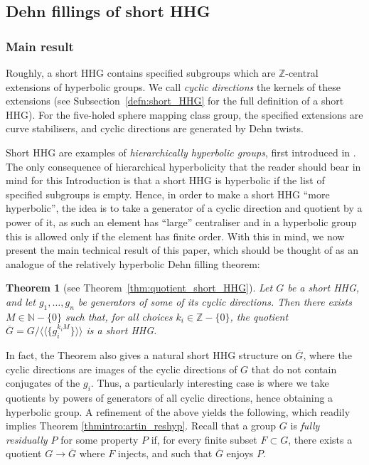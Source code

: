 \documentclass[svgnames]{amsart}
\theoremstyle{plain}
\newtheorem{thmintro}{Theorem}
\theoremstyle{definition}
\newcommand{\Z}{\mathbb{Z}}
\newcommand{\ov}[1]{\overline{#1}}
\begin{document}
\subsection*{Dehn fillings of short HHG}
\subsubsection*{Main result}
Roughly, a short HHG contains specified subgroups which are $\mathbb Z$-central extensions of hyperbolic groups. We call \emph{cyclic directions} the kernels of these extensions (see Subsection~\ref{defn:short_HHG} for the full definition of a short HHG). For the five-holed sphere mapping class group, the specified extensions are curve stabilisers, and cyclic directions are generated by Dehn twists. 

Short HHG are examples of \emph{hierarchically hyperbolic groups}, first introduced in \cite{HHS_I}. The only consequence of hierarchical hyperbolicity that the reader should bear in mind for this Introduction is that a short HHG is hyperbolic if the list of specified subgroups is empty. Hence, in order to make a short HHG “more hyperbolic”, the idea is to take a generator of a cyclic direction and quotient by a power of it, as such an element has “large” centraliser and in a hyperbolic group this is allowed only if the element has finite order. With this in mind, we now present the main technical result of this paper, which should be thought of as an analogue of the relatively hyperbolic Dehn filling theorem:

\begin{thmintro}[{see Theorem~\ref{thm:quotient_short_HHG}}]\label{thmintro:dehnfill}
Let $G$ be a short HHG, and let $g_1,\dots,g_n$ be generators of some of its cyclic directions. Then there exists $M\in\mathbb{N}-\{0\}$ such that, for all choices $k_i\in \Z-\{0\}$, the quotient $\ov{G}= G/\langle\langle \{g_i^{k_iM}\}\rangle\rangle$ is a short HHG.
\end{thmintro}

In fact, the Theorem also gives a natural short HHG structure on $\ov G$, where the cyclic directions are images of the cyclic directions of $G$ that do not contain conjugates of the $g_i$. Thus, a particularly interesting case is where we take quotients by powers of generators of all cyclic directions, hence obtaining a hyperbolic group. A refinement of the above yields the following, which readily implies Theorem \ref{thmintro:artin_reshyp}. Recall that a group $G$ is \emph{fully residually $P$} for some property $P$ if, for every finite subset $F\subset G$, there exists a quotient $G\to \ov G$ where $F$ injects, and such that $\ov G$ enjoys $P$.
\end{document}
